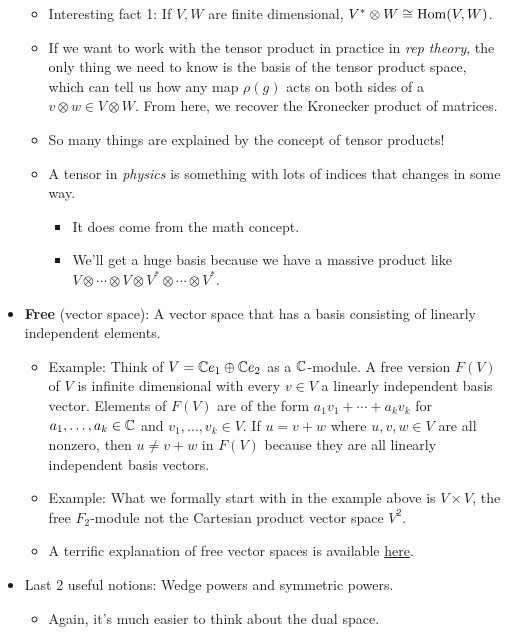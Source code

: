 \documentclass[../notes.tex]{subfiles}
\begin{document}
\begin{itemize}
\begin{itemize}
        \item Interesting fact 1: If $V,W$ are finite dimensional, $V^*\otimes W\cong\operatorname{Hom}(V,W)$.
        \item If we want to work with the tensor product in practice in \emph{rep theory}, the only thing we need to know is the basis of the tensor product space, which can tell us how any map $\rho(g)$ acts on both sides of a $v\otimes w\in V\otimes W$. From here, we recover the Kronecker product of matrices.
        \item So many things are explained by the concept of tensor products!
        \item A tensor in \emph{physics} is something with lots of indices that changes in some way.
        \begin{itemize}
            \item It does come from the math concept.
            \item We'll get a huge basis because we have a massive product like $V\otimes\cdots\otimes V\otimes V^*\otimes\cdots\otimes V^*$.
        \end{itemize}
    \end{itemize}
    \item \textbf{Free} (vector space): A vector space that has a basis consisting of linearly independent elements.
    \begin{itemize}
        \item Example: Think of $V=\mathbb{C} e_1\oplus\mathbb{C} e_2$ as a $\mathbb{C}$-module. A free version $F(V)$ of $V$ is infinite dimensional with every $v\in V$ a linearly independent basis vector. Elements of $F(V)$ are of the form $a_1v_1+\cdots+a_kv_k$ for $a_1,\dots,a_k\in\mathbb{C}$ and $v_1,\dots,v_k\in V$. If $u=v+w$ where $u,v,w\in V$ are all nonzero, then $u\neq v+w$ in $F(V)$ because they are all linearly independent basis vectors.
        \item Example: What we formally start with in the example above is $V\times V$, the free $F_2$-module not the Cartesian product vector space $V^2$.
        \item A terrific explanation of free vector spaces is available \href{https://math.stackexchange.com/questions/18315/free-vector-space-and-vector-space}{here}.
    \end{itemize}
    \item Last 2 useful notions: Wedge powers and symmetric powers.
    \begin{itemize}
        \item Again, it's much easier to think about the dual space.

\end{itemize}
\end{itemize}
\end{document}
